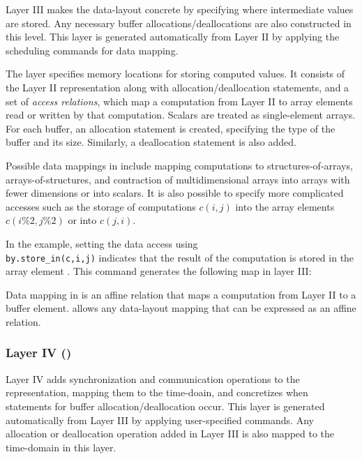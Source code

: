 Layer III makes the data-layout concrete by specifying where intermediate values are stored.  Any necessary buffer allocations/deallocations are also constructed in this level.  This layer is generated automatically from Layer II by applying the scheduling commands for data mapping.

The \layerthree layer specifies memory locations for storing computed values.  It consists of the Layer II representation along with allocation/deallocation statements, and a set of \emph{access relations},
which map a computation from Layer II to array elements read or written by that computation.  Scalars are treated as single-element arrays.  %
For each buffer, an allocation statement is created, specifying the type of the buffer and its size.  Similarly, a deallocation statement is also added.

Possible data mappings in \framework include mapping computations to structures-of-arrays, arrays-of-structures, and contraction of multidimensional arrays into arrays with fewer dimensions or into scalars.  It is also possible to specify more complicated accesses such as the storage of computations $c(i,j)$ into the array elements $c(i\%2,j\%2)$ or into $c(j,i)$.


In the example, setting the data access using\\ \texttt{by.store\_in({c,i,j})}
indicates that the result of the computation  is stored in the array element . This command generates the following map in layer III:

\noindent
{}

Data mapping in \framework is an affine relation that maps a computation from Layer II to a buffer element.  \framework allows any data-layout mapping that can be expressed as an affine relation.

\subsubsection{Layer IV (\Layerfour)}
\label{layer4}

Layer IV adds synchronization and communication operations to the representation, mapping them to the time-\processor doain,  and concretizes when statements for buffer allocation/deallocation occur.  This layer is generated automatically from Layer III by applying user-specified commands.
Any allocation or deallocation operation added in Layer III is also mapped to the time-\processor domain in this layer.
